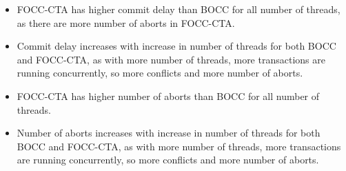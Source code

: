 \documentclass[12pt]{article}
\begin{document}
\begin{itemize}
    \item FOCC-CTA has higher commit delay than BOCC for all number of threads, as there are more number of aborts in FOCC-CTA.
    \item Commit delay increases with increase in number of threads for both BOCC and FOCC-CTA, as with more number of threads, more transactions are running concurrently, so more conflicts and more number of aborts.
    \item FOCC-CTA has higher number of aborts than BOCC for all number of threads.
    \item Number of aborts increases with increase in number of threads for both BOCC and FOCC-CTA, as with more number of threads, more transactions are running concurrently, so more conflicts and more number of aborts.
\end{itemize}
\end{document}
